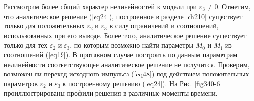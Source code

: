 \documentclass[14pt,a4paper]{extreport}
\begin{document}
			Рассмотрим более общий характер нелинейностей в модели при \(\varepsilon_{3}\ne0\). Отметим, что аналитическое решение (\ref{eq24}), построенное в разделе \ref{ch210} существует только для положительных \(\varepsilon_{2}\) и \(\varepsilon_{3}\) в силу ограничений и соотношений, использованных при его выводе. Более того, аналитическое решение существует только для тех \(\varepsilon_{2}\) и \(\varepsilon_{3}\), по которым возможно найти параметры \(M_{0}\) и \(M_{1}\) из соотношений (\ref{eq19}). В противном случае построить по данным параметрам нелинейности соответствующее аналитическое решение не получится. Проверим, возможен ли переход исходного импульса (\ref{eq48}) под действием положительных параметров \(\varepsilon_{2}\) и \(\varepsilon_{3}\) к построенному решению (\ref{eq24}). На Рис. \ref{fig340-6} проиллюстрированы профили решения в различные моменты времени.
\end{document}
